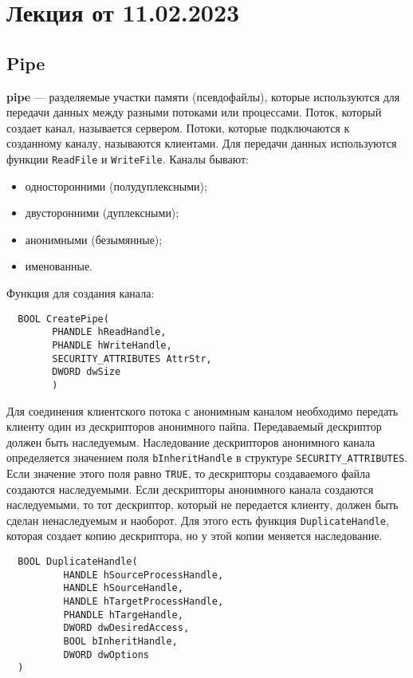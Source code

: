 
\section{Лекция от 11.02.2023}
\subsection{Pipe}
\textbf{pipe} --- разделяемые участки памяти (псевдофайлы), которые используются
для передачи данных между разными потоками или процессами. Поток, который
создает канал, называется сервером. Потоки, которые подключаются к созданному
каналу, называются клиентами. Для передачи данных используются функции
\verb!ReadFile! и \verb!WriteFile!.
Каналы бывают:
\begin{itemize}
  \item односторонними (полудуплексными);
  \item двусторонними (дуплексными);
  \item анонимными (безымянные);
  \item именованные.
\end{itemize} 

Функция для создания канала:
\begin{verbatim}
  BOOL CreatePipe(
        PHANDLE hReadHandle,
        PHANDLE hWriteHandle,
        SECURITY_ATTRIBUTES AttrStr,
        DWORD dwSize 
        )
\end{verbatim}

Для соединения клиентского потока с анонимным каналом необходимо передать
клиенту один из дескрипторов анонимного пайпа. Передаваемый дескриптор должен
быть наследуемым. Наследование дескрипторов анонимного канала определяется
значением поля \verb!bInheritHandle! в структуре \verb!SECURITY_ATTRIBUTES!.
Если значение этого поля равно \verb!TRUE!, то дескрипторы создаваемого файла
создаются наследуемыми. Если дескрипторы анонимного канала создаются
наследуемыми, то тот дескриптор, который не передается клиенту, должен быть
сделан ненаследуемым и наоборот. Для этого есть функция \verb!DuplicateHandle!,
которая создает копию дескриптора, но у этой копии меняется наследование.
\begin{verbatim}
  BOOL DuplicateHandle(
          HANDLE hSourceProcessHandle,
          HANDLE hSourceHandle,
          HANDLE hTargetProcessHandle,
          PHANDLE hTargeHandle,
          DWORD dwDesiredAccess,
          BOOL bInheritHandle,
          DWORD dwOptions
  )
\end{verbatim}

